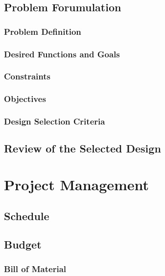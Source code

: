 \documentclass[ece]{uw-wkrpt}
\let\oldsection\section
\renewcommand\section{\clearpage\oldsection}
\begin{document}
\subsection{Problem Forumulation}

\subsubsection{Problem Definition}

\subsubsection{Desired Functions and Goals}

% 
\subsubsection{Constraints}

\subsubsection{Objectives}

% 
\subsubsection{Design Selection Criteria}

% 
\subsection{Review of the Selected Design}

% 
\section{Project Management}

% 
\subsection{Schedule}

% 
\subsection{Budget}

\subsubsection{Bill of Material}
\end{document}
